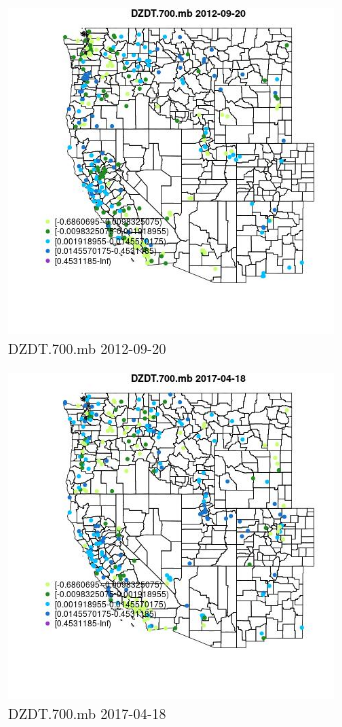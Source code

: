 \begin{figure} 
\centering  
\includegraphics[width=0.77\textwidth]{Code_Outputs/Report_ML_input_PM25_Step4_part_e_de_duplicated_aves_compiled_2019-05-14wNAs_MapObsDZDT700mb2012-09-20.jpg} 
\caption{\label{fig:Report_ML_input_PM25_Step4_part_e_de_duplicated_aves_compiled_2019-05-14wNAsMapObsDZDT700mb2012-09-20}DZDT.700.mb 2012-09-20} 
\end{figure} 
 

\begin{figure} 
\centering  
\includegraphics[width=0.77\textwidth]{Code_Outputs/Report_ML_input_PM25_Step4_part_e_de_duplicated_aves_compiled_2019-05-14wNAs_MapObsDZDT700mb2017-04-18.jpg} 
\caption{\label{fig:Report_ML_input_PM25_Step4_part_e_de_duplicated_aves_compiled_2019-05-14wNAsMapObsDZDT700mb2017-04-18}DZDT.700.mb 2017-04-18} 
\end{figure} 
 

